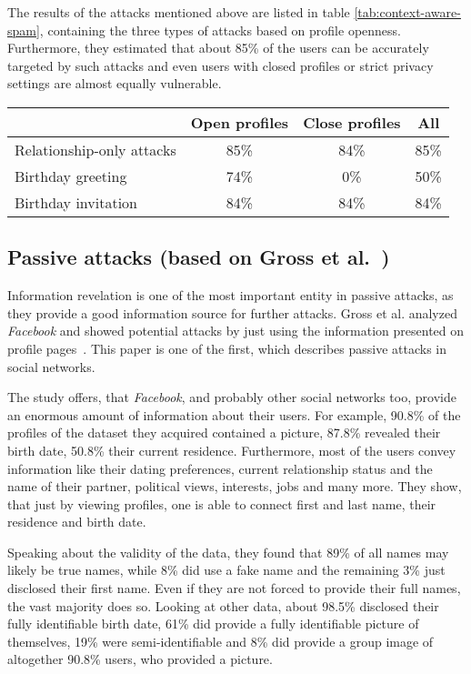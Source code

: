 The results of the attacks mentioned above are listed in table
\ref{tab:context-aware-spam}, containing the three types of attacks based on
profile openness. Furthermore, they estimated that about 85\% of the users
can be accurately targeted by such attacks and even users with closed
profiles or strict privacy settings are almost equally vulnerable.

\begin{table*}[ht]
  \centering
  \begin{tabular}{lccc}
    \toprule
    & Open profiles & Close profiles & All\\
    \midrule
    Relationship-only attacks & 85\% & 84\% & 85\% \\
    Birthday greeting         & 74\% &  0\% & 50\% \\
    Birthday invitation       & 84\% & 84\% & 84\% \\
    \bottomrule
  \end{tabular}
  \caption{Results of the case study of Brown et al.~\cite{brown2008}}
  \label{tab:context-aware-spam}
\end{table*}

\subsection[Passive attacks]{Passive attacks (based on Gross et al.~\cite{gross2005})}

Information revelation is one of the most important entity in passive attacks,
as they provide a good information source for further attacks. Gross et al.
analyzed \textit{Facebook} and showed potential attacks by just using the
information presented on profile pages~\cite{gross2005}. This paper is one
of the first, which describes passive attacks in social networks.

The study offers, that \textit{Facebook}, and probably other social networks
too, provide an enormous amount of information about their users. For example,
90.8\% of the profiles of the dataset they acquired contained a picture, 87.8\%
revealed their birth date, 50.8\% their current residence. Furthermore, most of
the users convey information like their dating preferences, current relationship
status and the name of their partner, political views, interests, jobs and many
more. They show, that just by viewing profiles, one is able to connect first
and last name, their residence and birth date.

Speaking about the validity of the data, they found that 89\% of all names may
likely be true names, while 8\% did use a fake name and the remaining 3\% just
disclosed their first name. Even if they are not forced to provide their full
names, the vast majority does so. Looking at other data, about 98.5\% disclosed
their fully identifiable birth date, 61\% did provide a fully identifiable
picture of themselves, 19\% were semi-identifiable and 8\% did provide a group
image of altogether 90.8\% users, who provided a picture.


